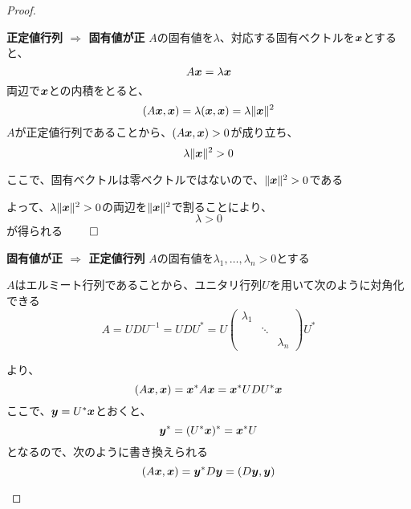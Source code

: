 \documentclass[../../../topic_linear-algebra]{subfiles}
\begin{document}
\begin{proof}
  \begin{subpattern}{\bfseries 正定値行列 $\Longrightarrow$ 固有値が正}
    $A$の固有値を$\lambda$、対応する固有ベクトルを$\vb*{x}$とすると、
    \begin{equation*}
      A\vb*{x} = \lambda \vb*{x}
    \end{equation*}
    両辺で$\vb*{x}$との内積をとると、
    \begin{equation*}
      (A\vb*{x}, \vb*{x}) = \lambda (\vb*{x}, \vb*{x}) = \lambda \|\vb*{x}\|^2
    \end{equation*}
    $A$が正定値行列であることから、$(A\vb*{x}, \vb*{x}) > 0$が成り立ち、
    \begin{equation*}
      \lambda \|\vb*{x}\|^2 > 0
    \end{equation*}

    \br

    ここで、固有ベクトルは零ベクトルではないので、$\|\vb*{x}\|^2 >0$である

    よって、$\lambda \|\vb*{x}\|^2 > 0$の両辺を$\|\vb*{x}\|^2$で割ることにより、
    \begin{equation*}
      \lambda > 0
    \end{equation*}
    が得られる $\qed$
  \end{subpattern}

  \begin{subpattern}{\bfseries 固有値が正 $\Longrightarrow$ 正定値行列}
    $A$の固有値を$\lambda_1,\ldots,\lambda_n >0$とする

    $A$はエルミート行列であることから、ユニタリ行列$U$を用いて次のように対角化できる
    \begin{equation*}
      A = U D U^{-1} = UDU^* = U \begin{pmatrix}
        \lambda_1 &        &           \\
                  & \ddots &           \\
                  &        & \lambda_n
      \end{pmatrix} U^*
    \end{equation*}

    より、
    \begin{equation*}
      (A\vb*{x}, \vb*{x}) = \vb*{x}^* A \vb*{x} = \vb*{x}^* U D U^* \vb*{x}
    \end{equation*}
    ここで、$\vb*{y} = U^* \vb*{x}$とおくと、
    \begin{equation*}
      \vb*{y}^* = (U^* \vb*{x})^* = \vb*{x}^* U
    \end{equation*}
    となるので、次のように書き換えられる
    \begin{equation*}
      (A\vb*{x}, \vb*{x}) = \vb*{y}^* D \vb*{y} = (D\vb*{y}, \vb*{y})
    \end{equation*}


\end{subpattern}
\end{proof}
\end{document}
